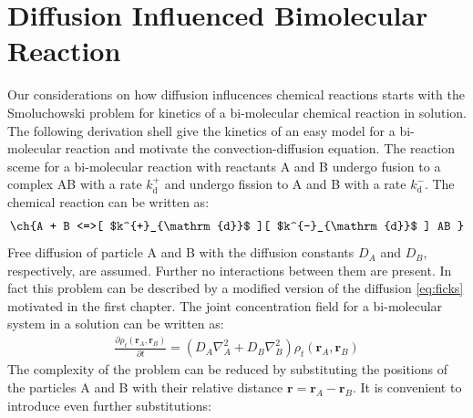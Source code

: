 \documentclass[
  a4paper,BCOR10mm,oneside,
  bibtotoc,idxtotoc,
  headsepline,footsepline,%
  fleqn,openbib
]{scrbook}
\begin{document}
% 
% 
% 
% 

\section{Diffusion Influenced Bimolecular Reaction}
Our considerations on how diffusion influcences chemical reactions starts with the Smoluchowski problem for kinetics of a bi-molecular chemical reaction in solution. The following derivation shell give the kinetics of an easy model for a bi-molecular reaction and motivate the convection-diffusion equation.\newline  
The reaction sceme for a bi-molecular reaction with reactants A and B undergo fusion to a complex AB with a rate $k^{+}_{\mathrm{d}}$ and undergo fission to A and B with a rate $k^{-}_{\mathrm{d}}$. The chemical reaction can be written as:
\begin{align*}
\text{\ch{A + B <=>[ $k^{+}_{\mathrm{d}}$ ][ $k^{-}_{\mathrm{d}}$ ] AB }}
\end{align*}
Free diffusion of particle A and B with the diffusion constants $D_A$ and $D_B$, respectively, are assumed. Further no interactions between them are present. In fact this problem can be described by a modified version of the diffusion \cref{eq:ficks} motivated in the first chapter.
The joint concentration field for a bi-molecular system in a solution can be written as:
\begin{align}
 \frac{\partial \rho_t(\bm{r}_A,\bm{r}_B)}{\partial t}=(D_A \nabla^{2}_{A}+D_B \nabla^{2}_{B}) \rho_t(\bm{r}_A,\bm{r}_B) \label{smolubi}
\end{align}
The complexity of the problem can be reduced by substituting the positions of the particles A and B with their relative distance $\bm{r}=\bm{r}_A-\bm{r}_B$. It is convenient to introduce even further substitutions:
\end{document}
